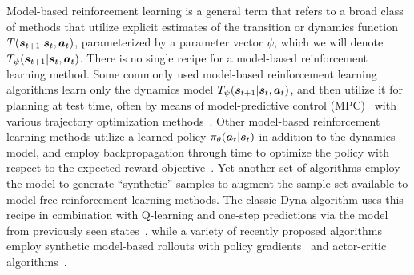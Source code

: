 \documentclass[../thesis.tex]{subfiles}
\begin{document}

~


~

Model-based reinforcement learning is a general term that refers to a broad class of methods that utilize explicit estimates of the transition or dynamics function $T(\boldsymbol{s}_{t+1}|\boldsymbol{s}_t,\boldsymbol{a}_t)$, parameterized by a parameter vector $\psi$, which we will denote $T_\psi(\boldsymbol{s}_{t+1}|\boldsymbol{s}_t,\boldsymbol{a}_t)$. There is no single recipe for a model-based reinforcement learning method. Some commonly used model-based reinforcement learning algorithms learn only the dynamics model $T_\psi(\boldsymbol{s}_{t+1}|\boldsymbol{s}_t,\boldsymbol{a}_t)$, and then utilize it for planning at test time, often by means of model-predictive control (MPC)~\citep{tassa2012synthesis} with various trajectory optimization methods~\citep{nagabandi2018neural,pets}. Other model-based reinforcement learning methods utilize a learned policy $\pi_\theta(\boldsymbol{a}_t|\boldsymbol{s}_t)$ in addition to the dynamics model, and employ backpropagation through time to optimize the policy with respect to the expected reward objective~\citep{deisenroth2011pilco}. Yet another set of algorithms employ the model to generate ``synthetic'' samples to augment the sample set available to model-free reinforcement learning methods. The classic Dyna algorithm uses this recipe in combination with Q-learning and one-step predictions via the model from previously seen states~\citep{sutton1991dyna}, while a variety of recently proposed algorithms employ synthetic model-based rollouts with policy gradients~\citep{pipps,simpl} and actor-critic algorithms~\citep{mbpo}. 
\end{document}

